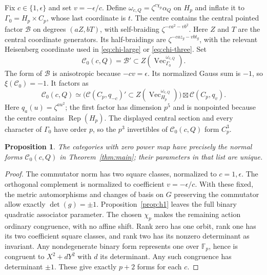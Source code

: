 \documentclass[11pt]{amsart}
\newtheorem{proposition}[theorem]{Proposition}
\theoremstyle{definition}\newtheorem{definition}[theorem]{Definition}
\newcommand{\Fp}{\mathbb F_p}
\renewcommand{\Vec}{\operatorname{Vec}}
\newcommand{\Rep}{\operatorname{Rep}}
\newcommand{\cB}{\mathcal B}
\newcommand{\cC}{\mathcal C}
\begin{document}
Fix $c\in\{1,\epsilon\}$ and set $v=-\epsilon/c$. Define
$\omega_{c,Q}=\zeta^{c\chi_p}\alpha_Q$ on $H_p$ and inflate it to
$\Gamma_0=H_p\times C_p$, whose last coordinate is $t$.
The centre contains the central pointed factor $\cB$ on degrees $(aZ,bT)$,
with self-braiding $\zeta^{-ca^2-vb^2}$. Here $Z$ and $T$ are the central
coordinate generators. Its half-braidings are
$\zeta^{-ca z_g-vbt_g}$, with the relevant Heisenberg coordinate used in
\eqref{eq:chi-large} or \eqref{eq:chi-three}.
Set
\[
\cC_0(c,Q)=\cB'\subset Z(\Vec_{\Gamma_0}^{\omega_{c,Q}}).
\]
The form of $\cB$ is anisotropic because $-cv=\epsilon$. Its normalized Gauss
sum is $-1$, so $\xi(\cC_0)=-1$. It factors as
\begin{equation}\label{eq:product}
\cC_0(c,Q)\simeq
\bigl(\cC(C_p,q_{-c})'\subset Z(\Vec_{H_p}^{\omega_{c,Q}})\bigr)
\boxtimes\cC(C_p,q_v).
\end{equation}
Here $q_a(u)=\zeta^{a u^2}$; the first factor has dimension $p^5$ and is
nonpointed because the centre contains $\Rep(H_p)$. The displayed central
section and every character of $\Gamma_0$ have order $p$, so the $p^3$
invertibles of $\cC_0(c,Q)$ form $C_p^3$.

\begin{proposition}\label{prop:product-orbits}
The categories with zero power map have precisely the normal forms
$\cC_0(c,Q)$ in Theorem~\ref{thm:main}; their parameters in that list are unique.
\end{proposition}
\begin{proof}
The commutator norm has two square classes, normalized to $c=1,\epsilon$.
The orthogonal complement is normalized to coefficient $v=-\epsilon/c$.
With these fixed, the metric automorphisms and changes of basis on $G$ preserving
the commutator allow exactly $\det(g)=\pm1$. Proposition~\ref{prop:h1} leaves
the full binary quadratic associator parameter. The chosen $\chi_p$ makes the
remaining action ordinary congruence, with no affine shift.
Rank zero has one orbit, rank one has its two coefficient square classes,
and rank two has its nonzero determinant as invariant. Any nondegenerate
binary form represents one over $\Fp$, hence is congruent to $X^2+dY^2$ with
$d$ its determinant. Any such congruence has determinant $\pm1$. These give
exactly $p+2$ forms for each $c$.
\end{proof}
\end{document}
